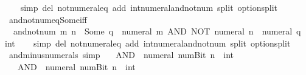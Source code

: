 \begin{isabellebody}
%
\isadelimproof
\ \ %
\endisadelimproof
%
\isatagproof
{}\isamarkupfalse%
\ {\isacharparenleft}{\kern0pt}simp\ del{\isacharcolon}{\kern0pt}\ not{\isacharunderscore}{\kern0pt}numeral{\isacharunderscore}{\kern0pt}eq\ add{\isacharcolon}{\kern0pt}\ int{\isacharunderscore}{\kern0pt}numeral{\isacharunderscore}{\kern0pt}and{\isacharunderscore}{\kern0pt}not{\isacharunderscore}{\kern0pt}num\ split{\isacharcolon}{\kern0pt}\ option{\isachardot}{\kern0pt}split{\isacharparenright}{\kern0pt}%
\endisatagproof
{\isafoldproof}%
%
\isadelimproof
\isanewline
%
\endisadelimproof
\isanewline
{}\isamarkupfalse%
\ and{\isacharunderscore}{\kern0pt}not{\isacharunderscore}{\kern0pt}num{\isacharunderscore}{\kern0pt}eq{\isacharunderscore}{\kern0pt}Some{\isacharunderscore}{\kern0pt}iff{\isacharcolon}{\kern0pt}\isanewline
\ \ {\isacartoucheopen}and{\isacharunderscore}{\kern0pt}not{\isacharunderscore}{\kern0pt}num\ m\ n\ {\isacharequal}{\kern0pt}\ Some\ q\ {\isasymlongleftrightarrow}\ numeral\ m\ AND\ NOT\ {\isacharparenleft}{\kern0pt}numeral\ n{\isacharparenright}{\kern0pt}\ {\isacharequal}{\kern0pt}\ {\isacharparenleft}{\kern0pt}numeral\ q\ {\isacharcolon}{\kern0pt}{\isacharcolon}{\kern0pt}\ int{\isacharparenright}{\kern0pt}{\isacartoucheclose}\isanewline
%
\isadelimproof
\ \ %
\endisadelimproof
%
\isatagproof
{}\isamarkupfalse%
\ {\isacharparenleft}{\kern0pt}simp\ del{\isacharcolon}{\kern0pt}\ not{\isacharunderscore}{\kern0pt}numeral{\isacharunderscore}{\kern0pt}eq\ add{\isacharcolon}{\kern0pt}\ int{\isacharunderscore}{\kern0pt}numeral{\isacharunderscore}{\kern0pt}and{\isacharunderscore}{\kern0pt}not{\isacharunderscore}{\kern0pt}num\ split{\isacharcolon}{\kern0pt}\ option{\isachardot}{\kern0pt}split{\isacharparenright}{\kern0pt}%
\endisatagproof
{\isafoldproof}%
%
\isadelimproof
\isanewline
%
\endisadelimproof
\isanewline
{}\isamarkupfalse%
\ and{\isacharunderscore}{\kern0pt}minus{\isacharunderscore}{\kern0pt}numerals\ {\isacharbrackleft}{\kern0pt}simp{\isacharbrackright}{\kern0pt}{\isacharcolon}{\kern0pt}\isanewline
\ \ {\isacartoucheopen}{}\ AND\ {\isacharminus}{\kern0pt}\ {\isacharparenleft}{\kern0pt}numeral\ {\isacharparenleft}{\kern0pt}num{\isachardot}{\kern0pt}Bit{}\ n{\isacharparenright}{\kern0pt}{\isacharparenright}{\kern0pt}\ {\isacharequal}{\kern0pt}\ {\isacharparenleft}{\kern0pt}{}{\isacharcolon}{\kern0pt}{\isacharcolon}{\kern0pt}int{\isacharparenright}{\kern0pt}{\isacartoucheclose}\isanewline
\ \ {\isacartoucheopen}{}\ AND\ {\isacharminus}{\kern0pt}\ {\isacharparenleft}{\kern0pt}numeral\ {\isacharparenleft}{\kern0pt}num{\isachardot}{\kern0pt}Bit{}\ n{\isacharparenright}{\kern0pt}{\isacharparenright}{\kern0pt}\ {\isacharequal}{\kern0pt}\ {\isacharparenleft}{\kern0pt}{}{\isacharcolon}{\kern0pt}{\isacharcolon}{\kern0pt}int{\isacharparenright}{\kern0pt}{\isacartoucheclose}\isanewline

\end{isabellebody}
